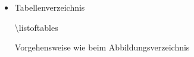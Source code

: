 \begin{frame}
\begin{itemize}
\item Tabellenverzeichnis\\
\medskip
\begin{ttfamily}{\normalsize
\color{nounibaredI}\textbackslash listoftables\\}
\end{ttfamily}
\medskip
Vorgehensweise wie beim Abbildungsverzeichnis\\

\end{itemize}
\end{frame}





